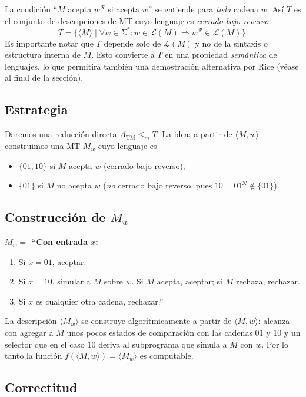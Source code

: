 \documentclass[11pt,a4paper]{article}
\theoremstyle{plain}
\theoremstyle{definition}
\theoremstyle{remark}
\newcommand{\TM}{\mathrm{TM}}
\newcommand{\enc}[1]{\langle #1\rangle}
\newcommand{\encMw}{\langle M, w\rangle}
\newcommand{\rev}[1]{#1^{\mathcal R}}
\newcommand{\lang}{\mathcal{L}}
\newcommand{\Sstar}{\Sigma^{*}}
\newcommand{\redm}{\le_{m}}
\newcommand{\ATM}{A_{\TM}}
\begin{document}
La condici\'on ``$M$ acepta $\rev{w}$ si acepta $w$'' se entiende para
\emph{toda} cadena $w$. As\'i $T$ es el conjunto de descripciones de MT cuyo
lenguaje es \emph{cerrado bajo reverso}:
\[
  T = \{\enc{M} \mid \forall w\in\Sstar : w\in\lang(M)\Rightarrow \rev{w}\in\lang(M)\}.
\]
Es importante notar que $T$ depende solo de $\lang(M)$ y no de la sintaxis o
estructura interna de $M$. Esto convierte a $T$ en una propiedad
\emph{sem\'antica} de lenguajes, lo que permitir\'a tambi\'en una
demostraci\'on alternativa por Rice (v\'ease al final de la secci\'on).

\subsection*{Estrategia}

Daremos una reducci\'on directa $\ATM \redm T$. La idea: a partir de
$\encMw$ construimos una MT $M_w$ cuyo lenguaje es
\begin{itemize}
  \item $\{01,10\}$ si $M$ acepta $w$ (cerrado bajo reverso);
  \item $\{01\}$ si $M$ no acepta $w$ (\emph{no} cerrado bajo reverso, pues
        $10=01^{\mathcal R}\notin\{01\}$).
\end{itemize}

\subsection*{Construcci\'on de $M_w$}

\medskip\noindent\textbf{$M_w=$ ``Con entrada $x$:}
\begin{enumerate}
  \item Si $x = 01$, aceptar.
  \item Si $x = 10$, simular a $M$ sobre $w$. Si $M$ acepta, aceptar;
        si $M$ rechaza, rechazar.
  \item Si $x$ es cualquier otra cadena, rechazar.''
\end{enumerate}
\medskip

La descripci\'on $\enc{M_w}$ se construye algor\'itmicamente a partir de
$\encMw$: alcanza con agregar a $M$ unos pocos estados de comparaci\'on
con las cadenas $01$ y $10$ y un selector que en el caso $10$ deriva al
subprograma que simula a $M$ con $w$. Por lo tanto la funci\'on
$f(\encMw) = \enc{M_w}$ es computable.

\subsection*{Correctitud}
\end{document}
